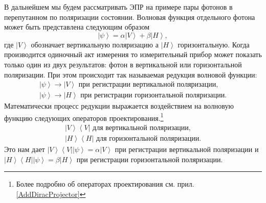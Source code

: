 В дальнейшем мы будем рассматривать ЭПР на примере пары фотонов в перепутанном 
по поляризации состоянии. Волновая функция отдельного фотона может быть 
представлена следующим образом
\begin{equation}
\left|\psi\right> = \alpha \left|V\right> +
\beta \left|H\right>, 
\label{eqEntaglementPSI}
\end{equation}
где $\left|V\right>$ обозначает вертикальную поляризацию а 
$\left|H\right>$ горизонтальную. Когда производится одиночный
акт измерения то измерительный прибор может показать только один из двух 
результатов: фотон в вертикальной или горизонтальной поляризации. При этом происходит 
так называемая редукция волновой функции:
\begin{eqnarray}
\left|\psi\right> \rightarrow \left|V\right> \mbox{ при регистрации вертикальной поляризации},
\nonumber \\
\left|\psi\right> \rightarrow \left|H\right> \mbox{ при регистрации горизонтальной поляризации}.
\nonumber
\end{eqnarray}
Математически процесс редукции выражается воздействием на волновую функцию следующих 
операторов проектирования.\footnote{Более подробно об операторах
  проектирования см. прил. \ref{AddDiracProjector}}
\begin{eqnarray}
\left|V\right>\left<V\right| \mbox{ для вертикальной поляризации},
\nonumber \\
 \left|H\right>\left<H\right| \mbox{ для горизонтальной поляризации}.
\label{eqEntaglementProjector}
\end{eqnarray}
Это нам дает $\left|V\right>\left<V\right|\left|\psi\right> = \alpha \left|V\right>$ 
при регистрации вертикальной поляризации и
$\left|H\right>\left<H\right|\left|\psi\right> = \beta \left|H\right>$ 
при регистрации горизонтальной поляризации.

